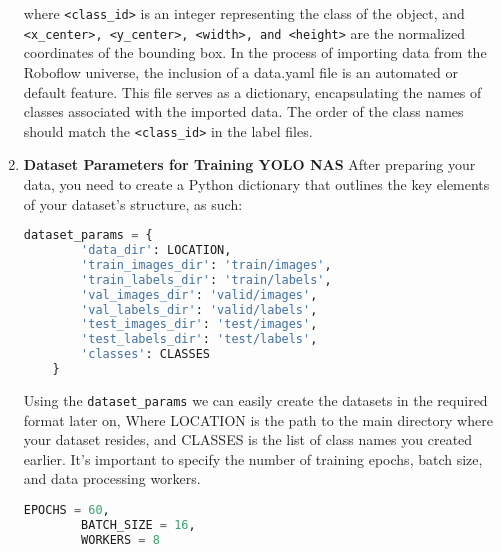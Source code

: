\begin{enumerate}
    where \verb|<class_id>| is an integer representing the class of the object, and 
    \texttt{<x\_center>, <y\_center>, <width>, and <height>}
    are the normalized coordinates of the bounding box.
   In the process of importing data from the Roboflow universe, the inclusion of a data.yaml file is an automated or default feature. This file serves as a dictionary, encapsulating the names of classes associated with the imported data. 
    The order of the class names should match the \texttt{<class\_id>} in the label files.
    \item \textbf{Dataset Parameters for Training YOLO NAS}
    After preparing your data, you need to create a Python dictionary that outlines the key elements of your dataset’s structure, as such: 
    \begin{lstlisting}[language=Python]
        dataset_params = {
        'data_dir': LOCATION,
        'train_images_dir': 'train/images',
        'train_labels_dir': 'train/labels',
        'val_images_dir': 'valid/images',
        'val_labels_dir': 'valid/labels',
        'test_images_dir': 'test/images',
        'test_labels_dir': 'test/labels',
        'classes': CLASSES
    }
    \end{lstlisting}
    Using the \texttt{dataset\_params} we can easily create the datasets in the required format later on,   Where LOCATION is the path to the main directory where your dataset resides, and CLASSES is the list of class names you created earlier. It's important to specify the number of training epochs, batch size, and data processing workers.
    \begin{lstlisting}[language=Python]
        EPOCHS = 60,
        BATCH_SIZE = 16,
        WORKERS = 8 
    \end{lstlisting}


\end{enumerate}
